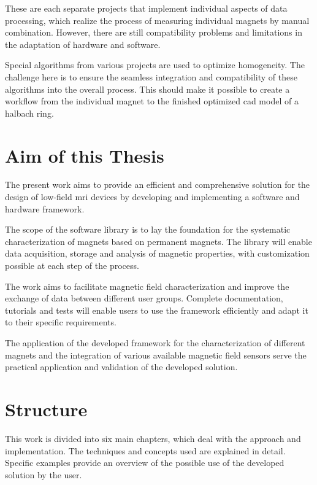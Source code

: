 These are each separate projects that implement individual aspects of
data processing, which realize the process of measuring individual
magnets by manual combination. However, there are still compatibility
problems and limitations in the adaptation of hardware and software.

Special algorithms from various projects are used to optimize
homogeneity. The challenge here is to ensure the seamless integration
and compatibility of these algorithms into the overall process. This
should make it possible to create a workflow from the individual magnet
to the finished optimized \gls{cad} model of a halbach ring.

\hypertarget{aim-of-this-thesis}{%
\section{Aim of this Thesis}\label{aim-of-this-thesis}}

The present work aims to provide an efficient and comprehensive solution
for the design of low-field \gls{mri} devices by developing and
implementing a software and hardware framework.

The scope of the software library is to lay the foundation for the
systematic characterization of magnets based on permanent magnets. The
library will enable data acquisition, storage and analysis of magnetic
properties, with customization possible at each step of the process.

The work aims to facilitate magnetic field characterization and improve
the exchange of data between different user groups. Complete
documentation, tutorials and tests will enable users to use the
framework efficiently and adapt it to their specific requirements.

The application of the developed framework for the characterization of
different magnets and the integration of various available magnetic
field sensors serve the practical application and validation of the
developed solution.

\hypertarget{structure}{%
\section{Structure}\label{structure}}

This work is divided into six main chapters, which deal with the
approach and implementation. The techniques and concepts used are
explained in detail. Specific examples provide an overview of the
possible use of the developed solution by the user.

